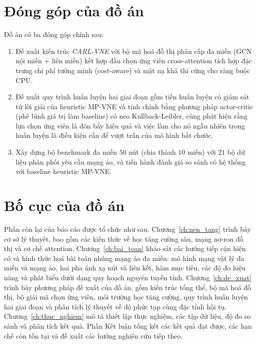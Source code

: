 \documentclass[../DoAn.tex]{subfiles}
\begin{document}
\section{Đóng góp của đồ án}

Đồ án có ba đóng góp chính sau:
\begin{enumerate}
\item Đề xuất kiến trúc \textit{CARL-VNE} với bộ mã hoá đồ thị phân cấp đa miền (GCN nội miền + liên miền) kết hợp đầu chọn ứng viên cross-attention tích hợp đặc trưng chi phí tường minh (cost-aware) và mặt nạ khả thi cứng cho ràng buộc CPU.
\item Đề xuất quy trình huấn luyện hai giai đoạn gồm tiền huấn luyện có giám sát từ lời giải của heuristic MP-VNE và tinh chỉnh bằng phương pháp actor-critic (phê bình giá trị làm baseline) có neo Kullback-Leibler, cùng phát hiện rằng lựa chọn ứng viên là đòn bẩy hiệu quả và việc làm cho nó ngẫu nhiên trong huấn luyện là điều kiện cần để vượt trần của mô hình bắt chước.
\item Xây dựng bộ benchmark đa miền $50$ nút (chia thành $10$ miền) với $21$ bộ dữ liệu phân phối yêu cầu mạng ảo, và tiến hành đánh giá so sánh có hệ thống với baseline heuristic MP-VNE.
\end{enumerate}

\section{Bố cục của đồ án}

Phần còn lại của báo cáo được tổ chức như sau. Chương~\ref{ch:nen_tang} trình bày cơ sở lý thuyết, bao gồm các kiến thức về học tăng cường sâu, mạng nơ-ron đồ thị và cơ chế attention. Chương~\ref{ch:bai_toan} khảo sát các hướng tiếp cận hiện có và hình thức hoá bài toán nhúng mạng ảo đa miền: mô hình mạng vật lý đa miền và mạng ảo, hai pha ánh xạ nút và liên kết, hàm mục tiêu, các độ đo hiệu năng và phát biểu dưới dạng quy hoạch nguyên tuyến tính. Chương~\ref{ch:de_xuat} trình bày phương pháp đề xuất của đồ án, gồm kiến trúc tổng thể, bộ mã hoá đồ thị, bộ giải mã chọn ứng viên, môi trường học tăng cường, quy trình huấn luyện hai giai đoạn và phân tích lý thuyết về độ phức tạp cùng đặc tính hội tụ. Chương~\ref{ch:thuc_nghiem} mô tả thiết lập thực nghiệm, các tập dữ liệu, độ đo so sánh và phân tích kết quả. Phần Kết luận tổng kết các kết quả đạt được, các hạn chế còn tồn tại và đề xuất các hướng nghiên cứu tiếp theo.
\end{document}
